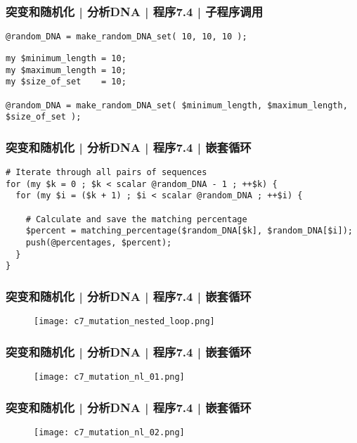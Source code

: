 \begin{frame}[fragile]
  \frametitle{突变和随机化 | 分析DNA | 程序7.4 | 子程序调用}
  \vspace{-1.5em}
\begin{lstlisting}
@random_DNA = make_random_DNA_set( 10, 10, 10 );
\end{lstlisting}
\pause
\begin{lstlisting}
my $minimum_length = 10;
my $maximum_length = 10;
my $size_of_set    = 10;

@random_DNA = make_random_DNA_set( $minimum_length, $maximum_length, $size_of_set );
\end{lstlisting}
\end{frame}

\begin{frame}[fragile]
  \frametitle{突变和随机化 | 分析DNA | 程序7.4 | \alert{嵌套循环}}
  \vspace{-1.5em}
\begin{lstlisting}
# Iterate through all pairs of sequences
for (my $k = 0 ; $k < scalar @random_DNA - 1 ; ++$k) {
  for (my $i = ($k + 1) ; $i < scalar @random_DNA ; ++$i) {

    # Calculate and save the matching percentage
    $percent = matching_percentage($random_DNA[$k], $random_DNA[$i]);
    push(@percentages, $percent);
  }
}
\end{lstlisting}
\end{frame}

\begin{frame}
  \frametitle{突变和随机化 | 分析DNA | 程序7.4 | 嵌套循环}
  \begin{figure}
    \centering
    \texttt{[image: c7\_mutation\_nested\_loop.png]}
  \end{figure}
\end{frame}

\begin{frame}
  \frametitle{突变和随机化 | 分析DNA | 程序7.4 | 嵌套循环}
  \begin{figure}
    \centering
    \texttt{[image: c7\_mutation\_nl\_01.png]}
  \end{figure}
\end{frame}

\begin{frame}
  \frametitle{突变和随机化 | 分析DNA | 程序7.4 | 嵌套循环}
  \begin{figure}
    \centering
    \texttt{[image: c7\_mutation\_nl\_02.png]}
  \end{figure}
\end{frame}

